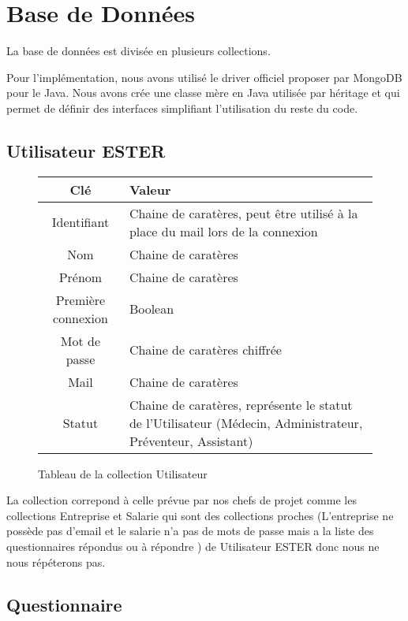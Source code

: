\section{Base de Données}

La base de données est divisée en plusieurs collections.

Pour l'implémentation, nous avons utilisé le driver officiel proposer par MongoDB pour le Java. Nous avons crée une classe mère en Java utilisée par héritage et qui permet de définir des interfaces simplifiant l'utilisation du reste du code.

\subsection{Utilisateur ESTER}

\begin{figure}[H]
    \begin{center}
        \begin{tabularx}{17cm}{|c|X|}
            \hline
            Clé & Valeur  \tabularnewline 
            \hline
            Identifiant & 
            Chaine de caratères, peut être utilisé à la place du mail lors de la connexion \tabularnewline 
            Nom & 
            Chaine de caratères \tabularnewline
            Prénom & 
            Chaine de caratères \tabularnewline
            Première connexion & 
            Boolean \tabularnewline
            Mot de passe & 
            Chaine de caratères chiffrée \tabularnewline
            Mail & 
            Chaine de caratères \tabularnewline
            Statut & 
            Chaine de caratères, représente le statut de l'Utilisateur (Médecin, Administrateur,
            Préventeur, Assistant) \tabularnewline
            \hline
        \end{tabularx}
    \end{center}
    \caption{Tableau de la collection Utilisateur}
\end{figure}

La collection correpond à celle prévue par nos chefs de projet comme
les collections Entreprise et Salarie qui sont des collections proches (L'entreprise ne possède 
pas d'email et le salarie n'a pas de mots de passe mais a la liste des questionnaires répondus ou à répondre
) de Utilisateur ESTER donc nous ne nous répéterons pas. 


\subsection{Questionnaire}

